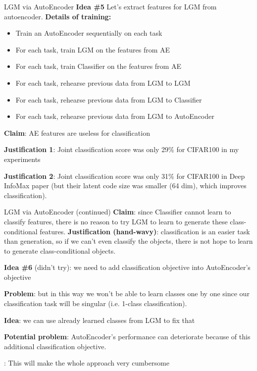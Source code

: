 \documentclass[10pt]{beamer}
\begin{document}
\begin{frame}{LGM via AutoEncoder}
    \textbf{Idea \#5} Let's extract features for LGM from autoencoder.
    \textbf{Details of training:}
    \begin{itemize}
        \item\pause Train an AutoEncoder sequentially on each task
        \item\pause For each task, train LGM on the features from AE
        \item\pause For each task, train Classifier on the features from AE
        \item\pause For each task, rehearse previous data from LGM to LGM
        \item\pause For each task, rehearse previous data from LGM to Classifier
        \item\pause For each task, rehearse previous data from LGM to AutoEncoder
    \end{itemize}
    
    \pause
    \textbf{Claim}: AE features are useless for classification
    
    \pause
    \textbf{Justification 1}: Joint classification score was only 29\% for CIFAR100 in my experiments
    
    \pause
    \textbf{Justification 2}: Joint classification score was only 31\% for CIFAR100 in Deep InfoMax paper (but their latent code size was smaller (64 dim), which improves classification).
\end{frame}

\begin{frame}{LGM via AutoEncoder (continued)}
    \pause
    \textbf{Claim}: since Classifier cannot learn to classify features, there is no reason to try LGM to learn to generate these class-conditional features.
    \textbf{Justification (hand-wavy)}: classification is an easier task than generation, so if we can't even classify the objects, there is not hope to learn to generate class-conditional objects.
    
    \pause
    \textbf{Idea \#6} (didn't try): we need to add classification objective into AutoEncoder's objective
    
    \pause
    \textbf{Problem}: but in this way we won't be able to learn classes one by one since our classification task will be singular (i.e. 1-class classification).
    
    \pause
    \textbf{Idea}: we can use already learned classes from LGM to fix that
    
    \pause
    \textbf{Potential problem}: AutoEncoder's performance can deteriorate because of this additional classification objective.
    
    : This will make the whole approach very cumbersome
\end{frame}
\end{document}
